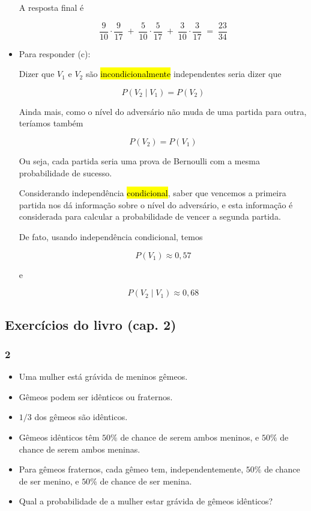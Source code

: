 \documentclass[
  11pt]{report}
\begin{document}
\begin{itemize}
  A resposta final é

  \[
  \frac{9}{10} \cdot \frac{9}{17} \;+\;
  \frac{5}{10} \cdot \frac{5}{17} \;+\;
  \frac{3}{10} \cdot \frac{3}{17}
  \;=\;
  \frac{23}{34}
  \]
\item
  Para responder (c):

  Dizer que $V_1$ e $V_2$ são {\hl{incondicionalmente}} independentes seria dizer que

  \[
  P(V_2 \mid V_1) = P(V_2)
  \]

  Ainda mais, como o nível do adversário não muda de uma partida para outra, teríamos também

  \[
  P(V_2) = P(V_1)
  \]

  Ou seja, cada partida seria uma prova de Bernoulli com a mesma probabilidade de sucesso.

  Considerando independência {\hl{condicional}}, saber que vencemos a primeira partida nos dá informação sobre o nível do adversário, e esta informação é considerada para calcular a probabilidade de vencer a segunda partida.

  De fato, usando independência condicional, temos

  \[
  P(V_1) \approx 0{,}57
  \]

  e

  \[
  P(V_2 \mid V_1) \approx 0{,}68
  \]
\end{itemize}

\hypertarget{exercuxedcios-do-livro-cap.-2}{%
\subsection*{Exercícios do livro (cap. 2)}\label{exercuxedcios-do-livro-cap.-2}}

\hypertarget{section-10}{%
\subsubsection*{2}\label{section-10}}

\begin{rmdbox}

\begin{itemize}
\item
  Uma mulher está grávida de meninos gêmeos.
\item
  Gêmeos podem ser idênticos ou fraternos.
\item
  $1/3$ dos gêmeos são idênticos.
\item
  Gêmeos idênticos têm $50\%$ de chance de serem ambos meninos, e $50\%$ de chance de serem ambos meninas.
\item
  Para gêmeos fraternos, cada gêmeo tem, independentemente, $50\%$ de chance de ser menino, e $50\%$ de chance de ser menina.
\item
  Qual a probabilidade de a mulher estar grávida de gêmeos idênticos?
\end{itemize}

\end{rmdbox}
\end{document}
